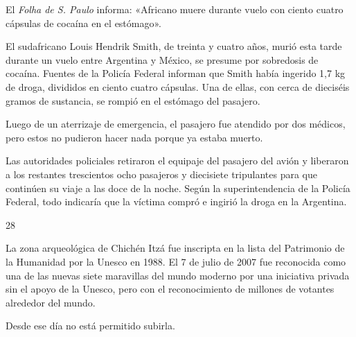 \documentclass[12pt,twoside,openright,a5paper]{book}
\begin{document}
\nopagebreak

\vspace{0.5cm}

\nopagebreak

El \emph{Folha de S. Paulo} informa: «Africano muere
durante vuelo con ciento cuatro cápsulas de cocaína en el estómago».

El sudafricano
Louis Hendrik Smith, de treinta y cuatro años, murió esta tarde durante un vuelo entre
Argentina y México, se presume por sobredosis de cocaína. Fuentes de
la Policía Federal informan que Smith había ingerido 1,7 kg de droga,
divididos en ciento cuatro cápsulas. Una de ellas, con cerca de dieciséis gramos de sustancia,
se rompió en el estómago del pasajero.

Luego de un aterrizaje de emergencia, el pasajero fue atendido por dos
médicos, pero estos no pudieron hacer nada porque ya estaba muerto.

Las autoridades policiales retiraron el equipaje del pasajero del avión y
liberaron a los restantes trescientos ocho pasajeros y diecisiete tripulantes para que continúen
su viaje a las doce de la noche.  Según la superintendencia de la Policía
Federal, todo indicaría que la víctima compró e ingirió la droga en
la Argentina.

\vspace{0.5cm}
\afterpage{}
\hrulefill \hspace{0.1cm}\decofourleft\hspace{0.2cm} 28 \hspace{0.2cm}\decofourright \hspace{0.1cm}\hrulefill

\nopagebreak

\vspace{0.5cm}

\nopagebreak

La zona arqueológica de Chichén Itzá fue inscripta en la lista del
Patrimonio de la Humanidad por la Unesco en 1988. El 7 de julio de 2007 fue
reconocida como una de las nuevas siete maravillas del mundo moderno por
una iniciativa privada sin el apoyo de la Unesco, pero con el reconocimiento
de millones de votantes alrededor del mundo.

Desde ese día no está permitido subirla.

\vspace{0.5cm}
\end{document}
